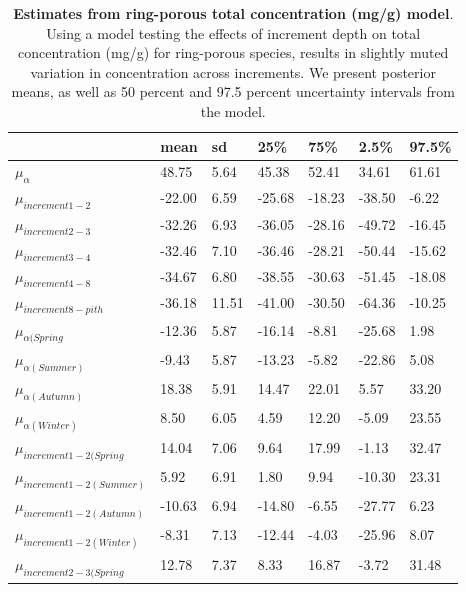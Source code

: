 \documentclass{article}\usepackage[]{graphicx}\usepackage[]{color}
\begin{document}
\begin{table}[ht]
\centering
\caption{\textbf{Estimates from ring-porous total concentration (mg/g) model}. Using a model testing the effects of increment depth on total concentration (mg/g) for ring-porous species, results in slightly muted variation in concentration across increments. We present posterior means, as well as 50 percent and 97.5 percent uncertainty intervals from the model.} 
\label{tab:ringtot}
\begingroup\footnotesize
\begin{tabular}{|p{}|p{}|p{}|p{}|p{}|p{}|p{}|}
  \hline
 & mean & sd & 25\% & 75\% & 2.5\% & 97.5\% \\ 
  \hline
$\mu_{\alpha}$ & 48.75 & 5.64 & 45.38 & 52.41 & 34.61 & 61.61 \\ 
  $\mu_{increment 1-2}$ & -22.00 & 6.59 & -25.68 & -18.23 & -38.50 & -6.22 \\ 
  $\mu_{increment 2-3}$ & -32.26 & 6.93 & -36.05 & -28.16 & -49.72 & -16.45 \\ 
  $\mu_{increment 3-4}$ & -32.46 & 7.10 & -36.46 & -28.21 & -50.44 & -15.62 \\ 
  $\mu_{increment 4-8}$ & -34.67 & 6.80 & -38.55 & -30.63 & -51.45 & -18.08 \\ 
  $\mu_{increment 8-pith}$ & -36.18 & 11.51 & -41.00 & -30.50 & -64.36 & -10.25 \\ 
  $\mu_{\alpha (Spring}$ & -12.36 & 5.87 & -16.14 & -8.81 & -25.68 & 1.98 \\ 
  $\mu_{\alpha (Summer)}$ & -9.43 & 5.87 & -13.23 & -5.82 & -22.86 & 5.08 \\ 
  $\mu_{\alpha (Autumn)}$ & 18.38 & 5.91 & 14.47 & 22.01 & 5.57 & 33.20 \\ 
  $\mu_{\alpha (Winter)}$ & 8.50 & 6.05 & 4.59 & 12.20 & -5.09 & 23.55 \\ 
  $\mu_{increment 1-2 (Spring}$ & 14.04 & 7.06 & 9.64 & 17.99 & -1.13 & 32.47 \\ 
  $\mu_{increment 1-2 (Summer)}$ & 5.92 & 6.91 & 1.80 & 9.94 & -10.30 & 23.31 \\ 
  $\mu_{increment 1-2 (Autumn)}$ & -10.63 & 6.94 & -14.80 & -6.55 & -27.77 & 6.23 \\ 
  $\mu_{increment 1-2 (Winter)}$ & -8.31 & 7.13 & -12.44 & -4.03 & -25.96 & 8.07 \\ 
  $\mu_{increment 2-3 (Spring}$ & 12.78 & 7.37 & 8.33 & 16.87 & -3.72 & 31.48 \\ 

\end{tabular}
\end{table}
\end{document}
